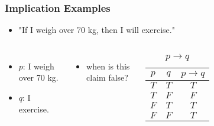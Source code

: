 \documentclass[dvipsnames]{beamer}
\begin{document}
\begin{frame}
  \frametitle{Implication Examples}

  \begin{example}
    \begin{itemize}
      \item "If I weigh over 70 kg, then I will exercise."
    \end{itemize}

    \pause
    \begin{columns}
      \begin{itemize}
        \item $p$: I weigh over 70 kg.
        \item $q$: I exercise.
      \end{itemize}

      \pause
      \begin{itemize}
        \item when is this claim false?
      \end{itemize}

      \begin{table}
        \caption{$p \rightarrow q$}
        \begin{tabular}{|c|c||c|}\hline
          $p$ & $q$ & $p \rightarrow q$\\\hline\hline
          $T$ & $T$ & $T$\\\hline
          $T$ & $F$ & $F$\\\hline
          $F$ & $T$ & $T$\\\hline
          $F$ & $F$ & $T$\\\hline
        \end{tabular}
      \end{table}
    \end{columns}
  \end{example}
\end{frame}
\end{document}
